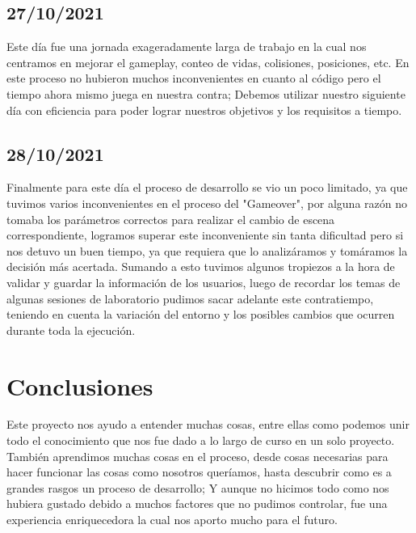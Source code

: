 \documentclass{article}
\begin{document}
    \subsection{27/10/2021}
    Este día fue una jornada exageradamente larga de trabajo en la cual nos centramos en mejorar el gameplay, conteo de vidas, colisiones, posiciones, etc. En este proceso no hubieron muchos inconvenientes en cuanto al código pero el tiempo ahora mismo juega en nuestra contra; Debemos utilizar nuestro siguiente día con eficiencia para poder lograr nuestros objetivos y los requisitos a tiempo.
    
    \subsection{28/10/2021}
    Finalmente para este día el proceso de desarrollo se vio un poco limitado, ya que tuvimos varios inconvenientes en el proceso del "Gameover", por alguna razón no tomaba los parámetros correctos para realizar el cambio de escena correspondiente, logramos superar este inconveniente sin tanta dificultad pero si nos detuvo un buen tiempo, ya que requiera que lo analizáramos y tomáramos la decisión más acertada. Sumando a esto tuvimos algunos tropiezos a la hora de validar y guardar la información de los usuarios, luego de recordar los temas de algunas sesiones de laboratorio pudimos sacar adelante este contratiempo, teniendo en cuenta  la variación del entorno y los posibles cambios que ocurren durante toda la ejecución. 

    \vspace*{2.5cm}

    \section{Conclusiones}
    Este proyecto nos ayudo a entender muchas cosas, entre ellas como podemos unir todo el conocimiento que nos fue dado a lo largo de curso en un solo proyecto. También aprendimos muchas cosas en el proceso, desde cosas necesarias para hacer funcionar las cosas como nosotros queríamos, hasta descubrir como es a grandes rasgos un proceso de desarrollo; Y aunque no hicimos todo como nos hubiera gustado debido a muchos factores que no pudimos controlar, fue una experiencia enriquecedora la cual nos aporto mucho para el futuro.
    
\vfill
\vspace*{0.5cm}


\end{document}
